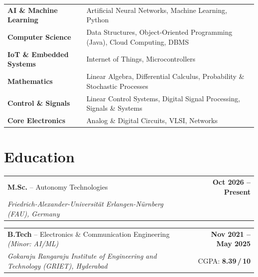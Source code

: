 \documentclass[a4paper,11pt]{article}
\begin{document}
\vspace{4pt}
\renewcommand{\arraystretch}{1.5}
\begin{tabularx}{\linewidth}{@{} >{\bfseries}l X @{}}
  
  AI \& Machine Learning    & Artificial Neural Networks, Machine Learning, Python \\
  
  Computer Science          & Data Structures, Object-Oriented Programming (Java), Cloud Computing, DBMS \\
  
  IoT \& Embedded Systems   & Internet of Things, Microcontrollers \\
  
  Mathematics               & Linear Algebra, Differential Calculus, Probability \& Stochastic Processes \\
  
  Control \& Signals        & Linear Control Systems, Digital Signal Processing, Signals \& Systems \\
  
  Core Electronics          & Analog \& Digital Circuits, VLSI, Networks \\
  
\end{tabularx}
\renewcommand{\arraystretch}{1}
\vspace{4pt}
\section{Education}

\begin{tabularx}{\linewidth}{@{}X r@{}}
  \textbf{M.Sc.} -- Autonomy Technologies &
  \textbf{ Oct 2026 -- Present} \\
  \textit{\color{lightgray}Friedrich-Alexander-Universität Erlangen-Nürnberg (FAU), Germany} &
  \\
\end{tabularx}

\vspace{6pt}

\begin{tabularx}{\linewidth}{@{}X r@{}}
  \textbf{B.Tech} -- Electronics \& Communication Engineering \textit{(Minor: AI/ML)} &
  \textbf{ Nov 2021 -- May 2025} \\
  \textit{\color{lightgray}Gokaraju Rangaraju Institute of Engineering and Technology (GRIET), Hyderabad} &
  \small\color{lightgray}CGPA: \textbf{8.39\,/\,10} \\
\end{tabularx}
\end{document}
